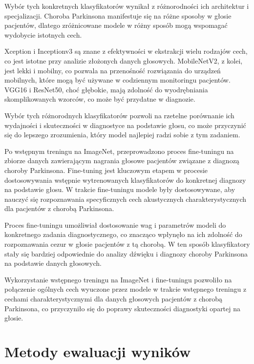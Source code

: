 Wybór tych konkretnych klasyfikatorów wynikał z różnorodności ich architektur i specjalizacji.
Choroba Parkinsona manifestuje się na różne sposoby w głosie pacjentów, dlatego zróżnicowane modele w różny sposób mogą wspomagać wydobycie istotnych cech.

Xception i Inceptionv3 są znane z efektywności w ekstrakcji wielu rodzajów cech, co jest istotne przy analizie złożonych danych głosowych.
MobileNetV2, z kolei, jest lekki i mobilny, co pozwala na przenośność rozwiązania do urządzeń mobilnych, które mogą być używane w codziennym monitoringu pacjentów.
VGG16 i ResNet50, choć głębokie, mają zdolność do wyodrębniania skomplikowanych wzorców, co może być przydatne w diagnozie.

Wybór tych różnorodnych klasyfikatorów pozwoli na rzetelne porównanie ich wydajności i skuteczności w diagnostyce na podstawie głosu, co może przyczynić się do lepszego zrozumienia, który model najlepiej radzi sobie z tym zadaniem.

Po wstępnym treningu na ImageNet, przeprowadzono proces fine-tuningu na zbiorze danych zawierającym nagrania głosowe pacjentów związane z diagnozą choroby Parkinsona.
Fine-tuning jest kluczowym etapem w procesie dostosowywania wstępnie wytrenowanych klasyfikatorów do konkretnej diagnozy na podstawie głosu.
W trakcie fine-tuningu modele były dostosowywane, aby nauczyć się rozpoznawania specyficznych cech akustycznych charakterystycznych dla pacjentów z chorobą Parkinsona.

Proces fine-tuningu umożliwiał dostosowanie wag i parametrów modeli do konkretnego zadania diagnostycznego, co znacząco wpłynęło na ich zdolność do rozpoznawania cezur w głosie pacjentów z tą chorobą.
W ten sposób klasyfikatory stały się bardziej odpowiednie do analizy dźwięku i diagnozy choroby Parkinsona na podstawie danych głosowych.

Wykorzystanie wstępnego treningu na ImageNet i fine-tuningu pozwoliło na połączenie ogólnych cech wyuczone przez modele w trakcie wstępnego treningu z cechami charakterystycznymi dla danych głosowych pacjentów z chorobą Parkinsona, co przyczyniło się do poprawy skuteczności diagnostyki opartej na głosie.

\section{Metody ewaluacji wyników}
\label{sec:metody-ewaluacji-wyników}

